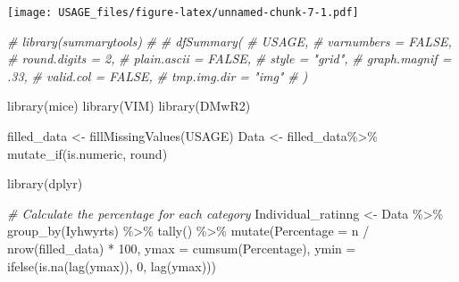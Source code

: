 \documentclass[
]{article}
\newenvironment{Shaded}{\begin{snugshade}}{\end{snugshade}}
\newcommand{\AttributeTok}[1]{\textcolor[rgb]{0.77,0.63,0.00}{#1}}
\newcommand{\CommentTok}[1]{\textcolor[rgb]{0.56,0.35,0.01}{\textit{#1}}}
\newcommand{\DecValTok}[1]{\textcolor[rgb]{0.00,0.00,0.81}{#1}}
\newcommand{\FunctionTok}[1]{\textcolor[rgb]{0.00,0.00,0.00}{#1}}
\newcommand{\NormalTok}[1]{#1}
\newcommand{\OtherTok}[1]{\textcolor[rgb]{0.56,0.35,0.01}{#1}}
\newcommand{\SpecialCharTok}[1]{\textcolor[rgb]{0.00,0.00,0.00}{#1}}
\begin{document}
\texttt{[image: USAGE\_files/figure-latex/unnamed-chunk-7-1.pdf]}

\begin{Shaded}
\begin{Highlighting}[]
\CommentTok{\# library(summarytools)}
\CommentTok{\# }
\CommentTok{\# dfSummary(}
\CommentTok{\#   USAGE,}
\CommentTok{\#   varnumbers = FALSE,}
\CommentTok{\#   round.digits = 2,}
\CommentTok{\#   plain.ascii = FALSE,}
\CommentTok{\#   style = "grid",}
\CommentTok{\#   graph.magnif = .33,}
\CommentTok{\#   valid.col = FALSE,}
\CommentTok{\#   tmp.img.dir = "img"}
\CommentTok{\# )}
\end{Highlighting}
\end{Shaded}

\begin{Shaded}
\begin{Highlighting}[]
\FunctionTok{library}\NormalTok{(mice)}
\FunctionTok{library}\NormalTok{(VIM)}
\FunctionTok{library}\NormalTok{(DMwR2)}

\NormalTok{filled\_data }\OtherTok{\textless{}{-}} \FunctionTok{fillMissingValues}\NormalTok{(USAGE)}
\NormalTok{Data }\OtherTok{\textless{}{-}}\NormalTok{ filled\_data}\SpecialCharTok{\%\textgreater{}\%}
        \FunctionTok{mutate\_if}\NormalTok{(is.numeric, round)}
\end{Highlighting}
\end{Shaded}

\begin{Shaded}
\begin{Highlighting}[]
\FunctionTok{library}\NormalTok{(dplyr)}

\CommentTok{\# Calculate the percentage for each category}
\NormalTok{Individual\_ratinng }\OtherTok{\textless{}{-}}\NormalTok{ Data }\SpecialCharTok{\%\textgreater{}\%}
  \FunctionTok{group\_by}\NormalTok{(Iyhwyrts) }\SpecialCharTok{\%\textgreater{}\%}
  \FunctionTok{tally}\NormalTok{() }\SpecialCharTok{\%\textgreater{}\%}
  \FunctionTok{mutate}\NormalTok{(}\AttributeTok{Percentage =}\NormalTok{ n }\SpecialCharTok{/} \FunctionTok{nrow}\NormalTok{(filled\_data) }\SpecialCharTok{*} \DecValTok{100}\NormalTok{,}
          \AttributeTok{ymax =} \FunctionTok{cumsum}\NormalTok{(Percentage),}
          \AttributeTok{ymin =} \FunctionTok{ifelse}\NormalTok{(}\FunctionTok{is.na}\NormalTok{(}\FunctionTok{lag}\NormalTok{(ymax)), }\DecValTok{0}\NormalTok{, }\FunctionTok{lag}\NormalTok{(ymax)))}
\end{Highlighting}
\end{Shaded}
\end{document}
